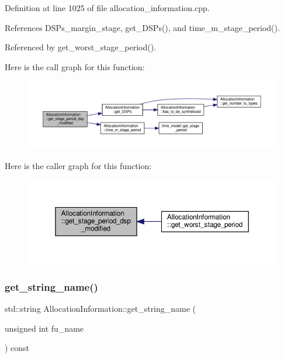 Definition at line 1025 of file allocation\+\_\+information.\+cpp.



References D\+S\+Ps\+\_\+margin\+\_\+stage, get\+\_\+\+D\+S\+Ps(), and time\+\_\+m\+\_\+stage\+\_\+period().



Referenced by get\+\_\+worst\+\_\+stage\+\_\+period().

Here is the call graph for this function\+:
\nopagebreak
\begin{figure}[H]
\begin{center}
\leavevmode
\includegraphics[width=350pt]{d7/d79/classAllocationInformation_aa7b6b9949f60f144839b167b83711994_cgraph}
\end{center}
\end{figure}
Here is the caller graph for this function\+:
\nopagebreak
\begin{figure}[H]
\begin{center}
\leavevmode
\includegraphics[width=350pt]{d7/d79/classAllocationInformation_aa7b6b9949f60f144839b167b83711994_icgraph}
\end{center}
\end{figure}
\mbox{\label{classAllocationInformation_a184fc8351b07d9fa39a576bf7dd97133}} 
\subsubsection{\texorpdfstring{get\+\_\+string\+\_\+name()}{get\_string\_name()}}
{\footnotesize\ttfamily std\+::string Allocation\+Information\+::get\+\_\+string\+\_\+name (\begin{DoxyParamCaption}\item[{unsigned int}]{fu\+\_\+name }\end{DoxyParamCaption}) const}



